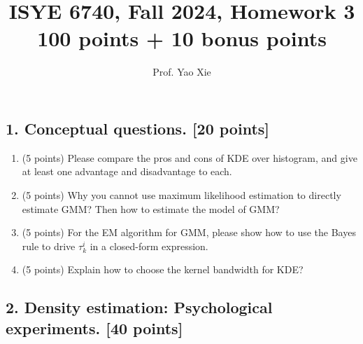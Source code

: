 \documentclass[12pt]{article}
\begin{document}
\title{ISYE 6740, Fall 2024, Homework 3\\{\small 100 points + 10 bonus points}}
\author{Prof. Yao Xie}
\date{}
\maketitle




\subsection*{1. Conceptual questions. [20 points]}


\begin{enumerate}[label*=\arabic*.]



\item (5 points) Please compare the pros and cons of KDE over histogram, and give at least one advantage and disadvantage to each.

\item (5 points) Why you cannot use maximum likelihood estimation to directly estimate GMM? Then how to estimate the model of GMM?

\item (5 points) For the EM algorithm for GMM, please show how to use the Bayes rule to drive $\tau_k^i$ in a closed-form expression. 

\item (5 points) Explain how to choose the kernel bandwidth for KDE? 

\end{enumerate}


\subsection*{2. Density estimation: Psychological experiments. [40 points]}
\end{document}
